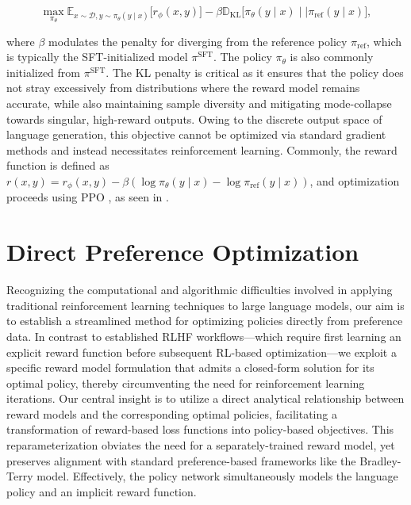 \begin{equation}\label{eq:RL}
\max_{\pi_{\theta}}  \mathbb{E}_{x\sim \mathcal{D}, y\sim \pi_{\theta}(y \mid x)}\bigl[r_{\phi}(x, y)\bigr] - \beta\mathbb{D}_{\textrm{KL}}\bigl[\pi_{\theta}(y\mid x)\mid \mid \pi_\text{ref}(y\mid x)\bigr],
\end{equation}

where $\beta$ modulates the penalty for diverging from the reference policy $\pi_\text{ref}$, which is typically the SFT-initialized model $\pi^\text{SFT}$. The policy $\pi_\theta$ is also commonly initialized from $\pi^\text{SFT}$. The KL penalty is critical as it ensures that the policy does not stray excessively from distributions where the reward model remains accurate, while also maintaining sample diversity and mitigating mode-collapse towards singular, high-reward outputs. Owing to the discrete output space of language generation, this objective cannot be optimized via standard gradient methods and instead necessitates reinforcement learning. Commonly, the reward function is defined as ${r(x, y) = r_{\phi}(x, y) -\beta (\log \pi_{\theta}(y\mid x) - \log \pi_\text{ref}(y\mid x))}$, and optimization proceeds using PPO \cite{schulman2017proximal}, as seen in \cite{ziegler2020finetuning, stiennon2022learning, bai2022training, ouyang2022training}.

\section{Direct Preference Optimization}\label{sec:DPO}

Recognizing the computational and algorithmic difficulties involved in applying traditional reinforcement learning techniques to large language models, our aim is to establish a streamlined method for optimizing policies directly from preference data. In contrast to established RLHF workflows—which require first learning an explicit reward function before subsequent RL-based optimization—we exploit a specific reward model formulation that admits a closed-form solution for its optimal policy, thereby circumventing the need for reinforcement learning iterations. Our central insight is to utilize a direct analytical relationship between reward models and the corresponding optimal policies, facilitating a transformation of reward-based loss functions into policy-based objectives. This reparameterization obviates the need for a separately-trained reward model, yet preserves alignment with standard preference-based frameworks like the Bradley-Terry model. Effectively, the policy network simultaneously models the language policy and an implicit reward function.

